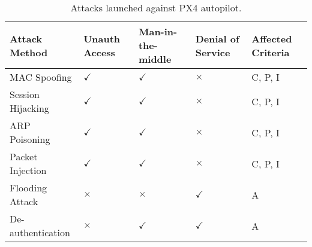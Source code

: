 \begin{table}
\centering
\hspace{-.7cm}
\caption{Attacks launched against PX4 autopilot.}
\begin{tabular}
{|p{2.2cm}|p{0.9cm}|p{0.9cm}|p{0.9cm}|p{1.2cm}|}

\hline 
\textbf{Attack Method} &  \textbf{Unauth Access}  & \textbf{Man-in-the-middle} & \textbf{Denial of Service} & \textbf{Affected Criteria}\\
\hline \hline
{MAC Spoofing} & \hfil $\checkmark$ & \hfil $\checkmark$ & \hfil $\times$ &  C, P, I  \\
\hline
{Session Hijacking}& \hfil $\checkmark$ & \hfil $\checkmark$ & \hfil $\times$&  C, P, I  \\
\hline
{ARP Poisoning} &  \hfil $\checkmark$ & \hfil 
$\checkmark$ & \hfil $\times$ &  C, P, I  \\
\hline
Packet Injection & \hfil $\checkmark$ & \hfil $\checkmark$ & \hfil $\times$ &  C, P, I  \\
\hline
Flooding Attack &  \hfil $\times$ & \hfil $\times$ & \hfil $\checkmark$ & A  \\
\hline
{De-authentication} & \hfil $\times$  & \hfil $\checkmark$ & \hfil $\checkmark$ & A  \\
\hline
\end{tabular}
\label{tab:attacks}
\end{table}